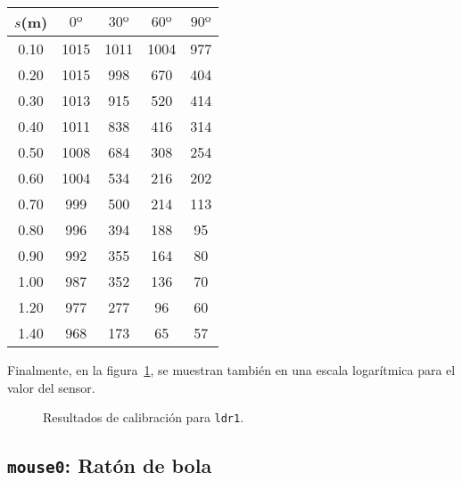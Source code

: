 \documentclass[10pt,a4paper,hidelinks,twocolumn]{article}
\begin{document}
\begin{center}
\begin{tabular}{ | c | c | c | c | c | }
\hline
$s$(m) & $0º$ & $30º$ & $60º$ & $90º$ \\ \hline
0.10 & 1015 & 1011 & 1004 & 977 \\ \hline
0.20 & 1015 & 998 & 670 & 404 \\ \hline
0.30 & 1013 & 915 & 520 & 414 \\ \hline
0.40 & 1011 & 838 & 416 & 314 \\ \hline
0.50 & 1008 & 684 & 308 & 254 \\ \hline
0.60 & 1004 & 534 & 216 & 202 \\ \hline
0.70 & 999 & 500 & 214 & 113 \\ \hline
0.80 & 996 & 394 & 188 & 95 \\ \hline
0.90 & 992 & 355 & 164 & 80 \\ \hline
1.00 & 987 & 352 & 136 & 70 \\ \hline
1.20 & 977 & 277 & 96 & 60 \\ \hline
1.40 & 968 & 173 & 65 & 57 \\ \hline
\end{tabular}
\end{center}

Finalmente, en la figura~\ref{fig:ldr1}, se muestran también en una escala 
logarítmica para el valor del sensor.

\begin{figure}[h]
\centering
{}
\caption{Resultados de calibración para \texttt{ldr1}.\label{fig:ldr1}}
\end{figure}
\subsection{\texttt{mouse0}: Ratón de bola}
\end{document}
